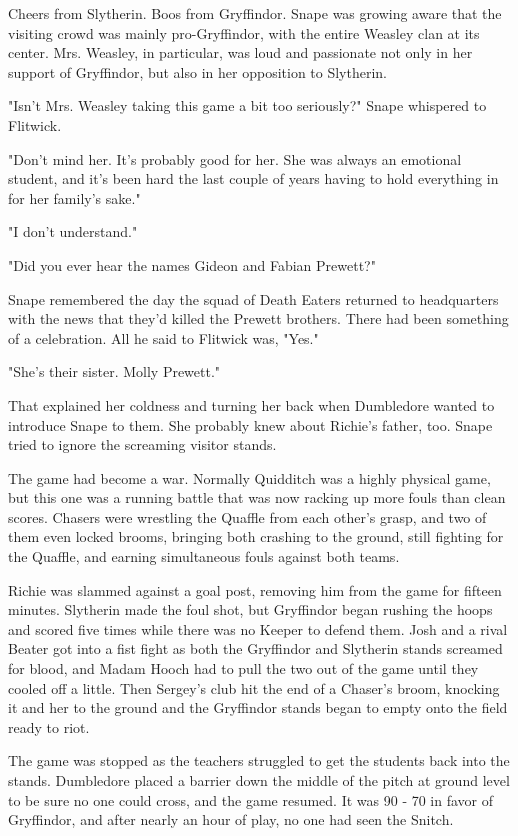 Cheers from Slytherin. Boos from Gryffindor. Snape was growing aware that the visiting crowd was mainly pro-Gryffindor, with the entire Weasley clan at its center. Mrs. Weasley, in particular, was loud and passionate not only in her support of Gryffindor, but also in her opposition to Slytherin.

"Isn't Mrs. Weasley taking this game a bit too seriously?" Snape whispered to Flitwick.

"Don't mind her. It's probably good for her. She was always an emotional student, and it's been hard the last couple of years having to hold everything in for her family's sake."

"I don't understand."

"Did you ever hear the names Gideon and Fabian Prewett?"

Snape remembered the day the squad of Death Eaters returned to headquarters with the news that they'd killed the Prewett brothers. There had been something of a celebration. All he said to Flitwick was, "Yes."

"She's their sister. Molly Prewett."

That explained her coldness and turning her back when Dumbledore wanted to introduce Snape to them. She probably knew about Richie's father, too. Snape tried to ignore the screaming visitor stands.

The game had become a war. Normally Quidditch was a highly physical game, but this one was a running battle that was now racking up more fouls than clean scores. Chasers were wrestling the Quaffle from each other's grasp, and two of them even locked brooms, bringing both crashing to the ground, still fighting for the Quaffle, and earning simultaneous fouls against both teams.

Richie was slammed against a goal post, removing him from the game for fifteen minutes. Slytherin made the foul shot, but Gryffindor began rushing the hoops and scored five times while there was no Keeper to defend them. Josh and a rival Beater got into a fist fight as both the Gryffindor and Slytherin stands screamed for blood, and Madam Hooch had to pull the two out of the game until they cooled off a little. Then Sergey's club hit the end of a Chaser's broom, knocking it and her to the ground and the Gryffindor stands began to empty onto the field ready to riot.

The game was stopped as the teachers struggled to get the students back into the stands. Dumbledore placed a barrier down the middle of the pitch at ground level to be sure no one could cross, and the game resumed. It was 90 - 70 in favor of Gryffindor, and after nearly an hour of play, no one had seen the Snitch.

